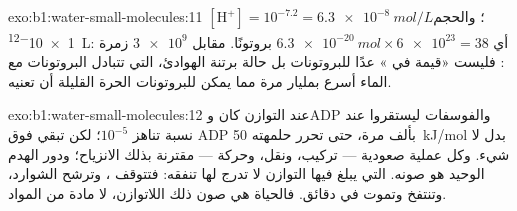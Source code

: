 \begin{solution}{exo:b1:water-small-molecules:11}
$[\mathrm{H^+}] = 10^{-7.2} = \qty{6.3e-8}{mol/L}$؛ والحجم
\qty{1e-12}{L}: أي $\qty{6.3e-20}{mol}\times\num{6e23} = 38$ بروتونًا.
مقابل $\num{3e9}$ زمرة : فليست «قيمة  في » عدًا للبروتونات بل حالة
برتنة الهوادئ، التي تتبادل البروتونات مع الماء أسرع بمليار مرة مما
يمكن للبروتونات الحرة القليلة أن تعنيه.
\end{solution}

\begin{solution}{exo:b1:water-small-molecules:12}
عند التوازن كان  وADP والفوسفات ليستقروا عند نسبة تناهز
$10^{-5}$؛ لكن  تبقي  فوق ADP بألف مرة، حتى تحرر حلمهته
\qty{50}{kJ/mol} بدل لا شيء. وكل عملية صعودية --- تركيب، ونقل، وحركة
--- مقترنة بذلك الانزياح؛ ودور الهدم الوحيد هو صونه.  التي
يبلغ  فيها التوازن لا تدرج لها تنفقه: فتتوقف ، وترشح
الشوارد، وتنتفخ  وتموت في دقائق. فالحياة هي صون ذلك اللاتوازن،
لا مادة من المواد.
\end{solution}

